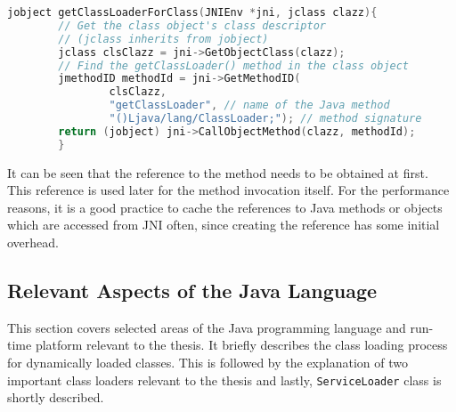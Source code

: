 \begin{lstlisting}[language=c++]
        jobject getClassLoaderForClass(JNIEnv *jni, jclass clazz){
        // Get the class object's class descriptor
        // (jclass inherits from jobject)
        jclass clsClazz = jni->GetObjectClass(clazz);
        // Find the getClassLoader() method in the class object
        jmethodID methodId = jni->GetMethodID(
		        clsClazz,
		        "getClassLoader", // name of the Java method
		        "()Ljava/lang/ClassLoader;"); // method signature
        return (jobject) jni->CallObjectMethod(clazz, methodId);
        }
\end{lstlisting}

It can be seen that the reference to the method needs to be obtained at first. This reference is used later for the method invocation itself. For the performance reasons, it is a good practice to cache the references to Java methods or objects which are accessed from JNI often, since creating the reference has some initial overhead.

\subsection{Relevant Aspects of the  Java Language}
This section covers selected areas of the Java programming language and run-time platform relevant to the thesis. It briefly describes the class loading process for dynamically loaded classes. This is followed by the explanation of two important class loaders relevant to the thesis and lastly, \texttt{ServiceLoader} class is shortly described.
